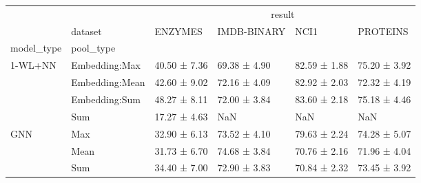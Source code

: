 \begin{tabular}{llllll}
\toprule
 &  & \multicolumn{4}{c}{result} \\
 & dataset & ENZYMES & IMDB-BINARY & NCI1 & PROTEINS \\
model_type & pool_type &  &  &  &  \\
\midrule
\multirow[t]{4}{*}{1-WL+NN} & Embedding:Max & 40.50 ± 7.36 & 69.38 ± 4.90 & 82.59 ± 1.88 & 75.20 ± 3.92 \\
 & Embedding:Mean & 42.60 ± 9.02 & 72.16 ± 4.09 & 82.92 ± 2.03 & 72.32 ± 4.19 \\
 & Embedding:Sum & 48.27 ± 8.11 & 72.00 ± 3.84 & 83.60 ± 2.18 & 75.18 ± 4.46 \\
 & Sum & 17.27 ± 4.63 & NaN & NaN & NaN \\
\cline{1-6}
\multirow[t]{3}{*}{GNN} & Max & 32.90 ± 6.13 & 73.52 ± 4.10 & 79.63 ± 2.24 & 74.28 ± 5.07 \\
 & Mean & 31.73 ± 6.70 & 74.68 ± 3.84 & 70.76 ± 2.16 & 71.96 ± 4.04 \\
 & Sum & 34.40 ± 7.00 & 72.90 ± 3.83 & 70.84 ± 2.32 & 73.45 ± 3.92 \\
\cline{1-6}
\bottomrule
\end{tabular}
